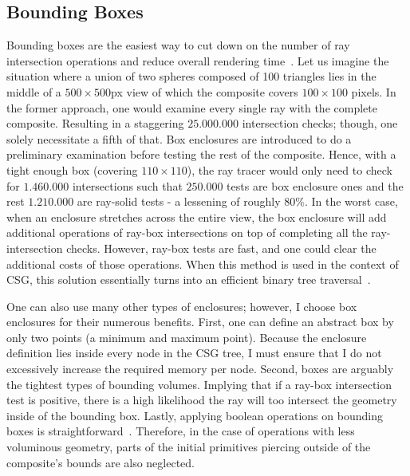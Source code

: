 \documentclass[a4paper,11pt,oneside]{article}
\begin{document}
\subsection{Bounding Boxes}
\label{section:bounding-boxes-optimization}

Bounding boxes are the easiest way to cut down on the number of ray intersection operations and reduce overall rendering time~\cite{efficient_csg_meshes}. Let us imagine the situation where a union of two spheres composed of 100 triangles lies in the middle of a $500\times500$px view of which the composite covers $100\times100$ pixels. In the former approach, one would examine every single ray with the complete composite. Resulting in a staggering $25.000.000$ intersection checks; though,  one solely necessitate a fifth of that. Box enclosures are introduced to do a preliminary examination before testing the rest of the composite. Hence, with a tight enough box (covering $110\times110$), the ray tracer would only need to check for $1.460.000$ intersections such that $250.000$ tests are box enclosure ones and the rest $1.210.000$ are ray-solid tests - a lessening of roughly $80\%$. In the worst case, when an enclosure stretches across the entire view, the box enclosure will add additional operations of ray-box intersections on top of completing all the ray-intersection checks. However, ray-box tests are fast, and one could clear the additional costs of those operations. When this method is used in the context of CSG, this solution essentially turns into an efficient binary tree traversal~\cite{ROTH1982109}. 

One can also use many other types of enclosures; however, I choose box enclosures for their numerous benefits. First, one can define an abstract box by only two points (a minimum and maximum point). Because the enclosure definition lies inside every node in the CSG tree, I must ensure that I do not excessively increase the required memory per node. Second, boxes are arguably the tightest types of bounding volumes. Implying that if a ray-box intersection test is positive, there is a high likelihood the ray will too intersect the geometry inside of the bounding box. Lastly, applying boolean operations on bounding boxes is straightforward~\cite{ROTH1982109}. Therefore, in the case of operations with less voluminous geometry, parts of the initial primitives piercing outside of the composite's bounds are also neglected.
\end{document}
